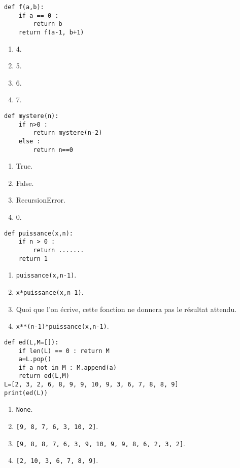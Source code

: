 \begin{lstlisting}
def f(a,b):
    if a == 0 :
        return b
    return f(a-1, b+1)
\end{lstlisting}

\begin{enumerate}
\item 4.
\item 5.
\item 6.
\item 7. %
\end{enumerate}

\begin{lstlisting}
def mystere(n):
    if n>0 :
        return mystere(n-2)
    else :
        return n==0
\end{lstlisting}

\begin{enumerate}
\item True.
\item False. %
\item RecursionError.
\item 0.
\end{enumerate}

\begin{lstlisting}
def puissance(x,n):
    if n > 0 : 
        return .......
    return 1
\end{lstlisting}

\begin{enumerate}
\item \texttt{puissance(x,n-1)}.
\item \texttt{x*puissance(x,n-1)}. %
\item Quoi que l'on écrive, cette fonction ne donnera pas le résultat attendu.
\item \texttt{x**(n-1)*puissance(x,n-1)}.
\end{enumerate}

\begin{lstlisting}
def ed(L,M=[]):
    if len(L) == 0 : return M
    a=L.pop()
    if a not in M : M.append(a)
    return ed(L,M)
L=[2, 3, 2, 6, 8, 9, 9, 10, 9, 3, 6, 7, 8, 8, 9]
print(ed(L))
\end{lstlisting}

\begin{enumerate}
\item \texttt{None}.
\item \texttt{[9, 8, 7, 6, 3, 10, 2]}. %
\item \texttt{[9, 8, 8, 7, 6, 3, 9, 10, 9, 9, 8, 6, 2, 3, 2]}.
\item \texttt{[2, 10, 3, 6, 7, 8, 9]}.
\end{enumerate}

